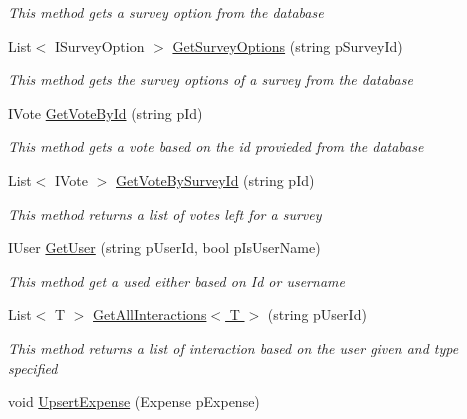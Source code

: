 \begin{DoxyCompactItemize}
\begin{DoxyCompactList}\small\item\em This method gets a survey option from the database \end{DoxyCompactList}\item 
List$<$ I\+Survey\+Option $>$ \hyperlink{class_plex_byte_1_1_mo_cap_1_1_managers_1_1_data_manager_a32bb616f670aac22a1d7125e3f0f4a64}{Get\+Survey\+Options} (string p\+Survey\+Id)
\begin{DoxyCompactList}\small\item\em This method gets the survey options of a survey from the database \end{DoxyCompactList}\item 
I\+Vote \hyperlink{class_plex_byte_1_1_mo_cap_1_1_managers_1_1_data_manager_a1d18d1570758b5f087b58c52ba8c475a}{Get\+Vote\+By\+Id} (string p\+Id)
\begin{DoxyCompactList}\small\item\em This method gets a vote based on the id provieded from the database \end{DoxyCompactList}\item 
List$<$ I\+Vote $>$ \hyperlink{class_plex_byte_1_1_mo_cap_1_1_managers_1_1_data_manager_a9610fea394ac7baa6a024d3ed2a3dcbe}{Get\+Vote\+By\+Survey\+Id} (string p\+Id)
\begin{DoxyCompactList}\small\item\em This method returns a list of votes left for a survey \end{DoxyCompactList}\item 
I\+User \hyperlink{class_plex_byte_1_1_mo_cap_1_1_managers_1_1_data_manager_a4e3e2e65e208a82cbe68eb0f77b19ab6}{Get\+User} (string p\+User\+Id, bool p\+Is\+User\+Name)
\begin{DoxyCompactList}\small\item\em This method get a used either based on Id or username \end{DoxyCompactList}\item 
List$<$ T $>$ \hyperlink{class_plex_byte_1_1_mo_cap_1_1_managers_1_1_data_manager_a50aab7b78c6a9e8b2b248f8678f2cce1}{Get\+All\+Interactions$<$ T $>$} (string p\+User\+Id)
\begin{DoxyCompactList}\small\item\em This method returns a list of interaction based on the user given and type specified \end{DoxyCompactList}\item 
void \hyperlink{class_plex_byte_1_1_mo_cap_1_1_managers_1_1_data_manager_adc4eb6bcaa9dbbb828fe7d121f5fdbd2}{Upsert\+Expense} (Expense p\+Expense)

\end{DoxyCompactItemize}
